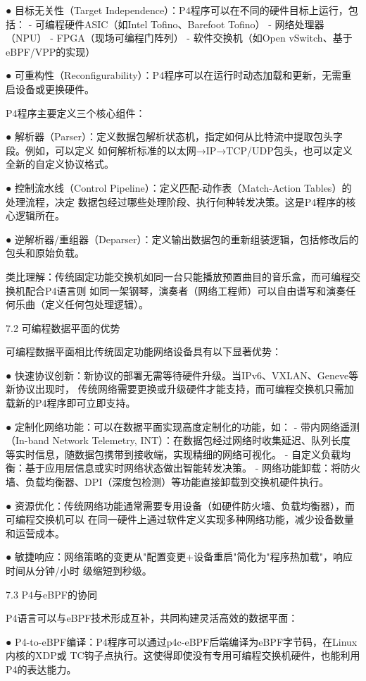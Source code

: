 ● 目标无关性（Target Independence）：P4程序可以在不同的硬件目标上运行，包括：
  - 可编程硬件ASIC（如Intel Tofino、Barefoot Tofino）
  - 网络处理器（NPU）
  - FPGA（现场可编程门阵列）
  - 软件交换机（如Open vSwitch、基于eBPF/VPP的实现）
  
● 可重构性（Reconfigurability）：P4程序可以在运行时动态加载和更新，无需重启设备或更换硬件。

P4程序主要定义三个核心组件：

● 解析器（Parser）：定义数据包解析状态机，指定如何从比特流中提取包头字段。例如，可以定义
  如何解析标准的以太网→IP→TCP/UDP包头，也可以定义全新的自定义协议格式。
  
● 控制流水线（Control Pipeline）：定义匹配-动作表（Match-Action Tables）的处理流程，决定
  数据包经过哪些处理阶段、执行何种转发决策。这是P4程序的核心逻辑所在。
  
● 逆解析器/重组器（Deparser）：定义输出数据包的重新组装逻辑，包括修改后的包头和原始负载。

类比理解：传统固定功能交换机如同一台只能播放预置曲目的音乐盒，而可编程交换机配合P4语言则
如同一架钢琴，演奏者（网络工程师）可以自由谱写和演奏任何乐曲（定义任何包处理逻辑）。

7.2  可编程数据平面的优势

可编程数据平面相比传统固定功能网络设备具有以下显著优势：

● 快速协议创新：新协议的部署无需等待硬件升级。当IPv6、VXLAN、Geneve等新协议出现时，
  传统网络需要更换或升级硬件才能支持，而可编程交换机只需加载新的P4程序即可立即支持。
  
● 定制化网络功能：可以在数据平面实现高度定制化的功能，如：
  - 带内网络遥测（In-band Network Telemetry, INT）：在数据包经过网络时收集延迟、队列长度
    等实时信息，随数据包携带到接收端，实现精细的网络可视化。
  - 自定义负载均衡：基于应用层信息或实时网络状态做出智能转发决策。
  - 网络功能卸载：将防火墙、负载均衡器、DPI（深度包检测）等功能直接卸载到交换机硬件执行。
  
● 资源优化：传统网络功能通常需要专用设备（如硬件防火墙、负载均衡器），而可编程交换机可以
  在同一硬件上通过软件定义实现多种网络功能，减少设备数量和运营成本。
  
● 敏捷响应：网络策略的变更从"配置变更+设备重启"简化为"程序热加载"，响应时间从分钟/小时
  级缩短到秒级。

7.3  P4与eBPF的协同

P4语言可以与eBPF技术形成互补，共同构建灵活高效的数据平面：

● P4-to-eBPF编译：P4程序可以通过p4c-eBPF后端编译为eBPF字节码，在Linux内核的XDP或
  TC钩子点执行。这使得即使没有专用可编程交换机硬件，也能利用P4的表达能力。
  
